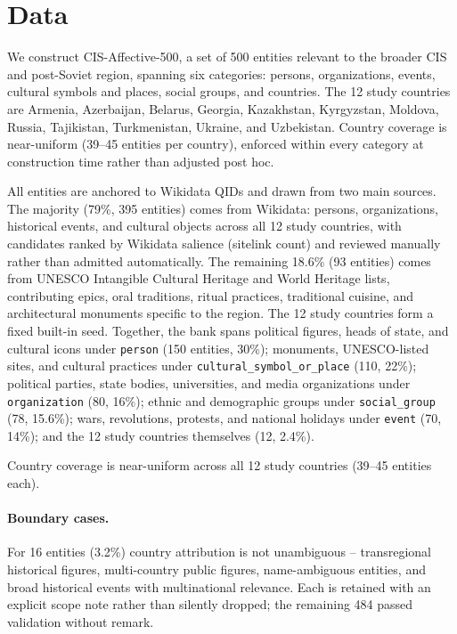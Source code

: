 \documentclass[runningheads,a4paper]{llncs}
\begin{document}
\section{Data}
\label{sec:targetbank}

We construct CIS-Affective-500, a set of 500 entities relevant to the broader CIS and post-Soviet region, spanning six categories: persons, organizations, events, cultural symbols and places, social groups, and countries. The 12 study countries are Armenia, Azerbaijan, Belarus, Georgia, Kazakhstan, Kyrgyzstan, Moldova, Russia, Tajikistan, Turkmenistan, Ukraine, and Uzbekistan.
Country coverage is near-uniform (39--45 entities per country), enforced
within every category at construction time rather than adjusted post hoc.

All entities are anchored to Wikidata QIDs and drawn from two main
sources. The majority (79\%, 395 entities) comes from Wikidata: persons,
organizations, historical events, and cultural objects across all 12 study
countries, with candidates ranked by Wikidata salience (sitelink count)
and reviewed manually rather than admitted automatically. The remaining 18.6\%
(93 entities) comes from UNESCO Intangible Cultural Heritage and World
Heritage lists, contributing epics, oral traditions, ritual practices,
traditional cuisine, and architectural monuments specific to the region.
The 12 study countries form a fixed built-in seed. Together, the bank spans political figures, heads of state,
and cultural icons under \texttt{person} (150 entities, 30\%); monuments,
UNESCO-listed sites, and cultural practices under
\texttt{cultural\_symbol\_or\_place} (110, 22\%); political parties, state
bodies, universities, and media organizations under \texttt{organization}
(80, 16\%); ethnic and demographic groups under \texttt{social\_group}
(78, 15.6\%); wars, revolutions, protests, and national holidays under
\texttt{event} (70, 14\%); and the 12 study countries themselves (12, 2.4\%).

Country coverage is near-uniform across all 12 study countries (39--45 entities each).

\paragraph{Boundary cases.} For 16 entities (3.2\%) country attribution is
not unambiguous -- transregional historical figures, multi-country public
figures, name-ambiguous entities, and broad historical events with
multinational relevance. Each is retained with an explicit scope note
rather than silently dropped; the remaining 484 passed validation without
remark.
\end{document}
